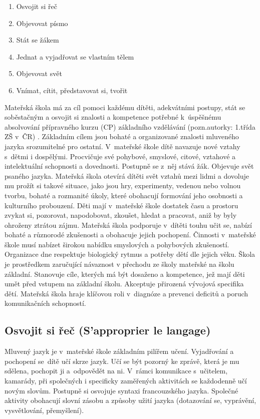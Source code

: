 	\begin{enumerate}[1]
		\setlength\itemsep{-2mm}
		\item Osvojit si řeč 
		\item Objevovat písmo 
		\item Stát se žákem 
		\item Jednat a vyjadřovat se vlastním tělem 
		\item Objevovat svět
		\item Vnímat, cítit, představovat si, tvořit
	\end{enumerate}

	Mateřská škola má za cíl pomoci každému dítěti, adekvátními postupy, stát se soběstačným a osvojit si znalosti a kompetence potřebné k úspěšnému absolvování přípravného kurzu (CP) základního vzdělávání (pozn.autorky: 1.třída ZŠ v ČR) . Základním cílem jsou bohaté a organizované  znalosti mluveného jazyka srozumitelné pro ostatní. V mateřské škole dítě navazuje nové vztahy s dětmi i dospělými. Procvičuje své pohybové, smyslové, citové, vztahové a intelektuální schopnosti a dovednosti. Postupně se z něj stává žák. Objevuje svět psaného jazyka. 
	Mateřská škola otevírá dítěti svět vztahů mezi lidmi a dovoluje mu prožít si takové situace, jako jsou hry, experimenty, vedenou nebo volnou tvorbu, bohaté a rozmanité úkoly, které obohacují formování jeho osobnosti a kulturního probouzení. 
	Děti mají v mateřské škole dostatek času a prostoru zvykat si, pozorovat, napodobovat, zkoušet, hledat a pracovat, aniž by byly ohroženy ztrátou zájmu. Mateřská škola podporuje v dítěti touhu učit se, nabízí bohaté a různorodé zkušenosti a obohacuje jejich pochopení. 
	Činnosti v mateřské škole musí nabízet širokou nabídku smyslových a pohybových zkušeností. Organizace dne respektuje biologický rytmus a potřeby dětí dle jejich věku. 
	Škola je prostředkem zaručující návaznost v přechodu ze školy mateřské na školu základní. Stanovuje cíle, kterých má být dosaženo a kompetence, jež mají děti umět před vstupem na základní školu. Akceptuje přirozená vývojová specifika dětí. Mateřská škola hraje klíčovou roli v diagnóze a prevenci deficitů a poruch komunikačních schopností.

		\subsection{Osvojit si řeč (S'approprier le langage)}
			Mluvený jazyk je v mateřské škole základním pilířem učení. Vyjadřování a pochopení se dítě učí skrze jazyk. Učí se být pozorný ke zprávě, která je mu sdělena, pochopit ji a odpovědět na ni. V rámci komunikace s učitelem, kamarády, při společných i specificky zaměřených aktivitách se každodenně učí novým slovům. Postupně si osvojuje syntaxi francouzského jazyka. Společné aktivity obohacují slovní zásobu a způsoby užití jazyka (dotazování se, vyprávění, vysvětlování, přemyšlení).

